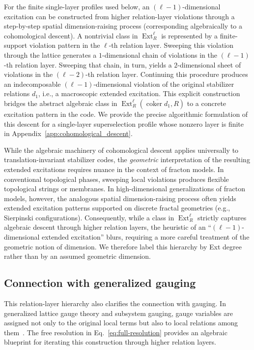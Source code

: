 \documentclass[aps,prx,english,superscriptaddress,twocolumn,tightenlines,showpacs,longbibliography,floatfix,amsfonts]{revtex4-2}
\theoremstyle{remark}
\theoremstyle{definition}
\begin{document}
For the finite single-layer profiles used below, an $(\ell-1)$-dimensional
excitation can be constructed from higher relation-layer violations through a
step-by-step spatial
dimension-raising process (corresponding algebraically to a cohomological
descent). A nontrivial class in $\operatorname{Ext}_R^\ell$ is represented by
a finite-support violation pattern in the $\ell$-th relation layer. Sweeping
this violation through the lattice generates a $1$-dimensional chain of
violations in the $(\ell-1)$-th relation layer. Sweeping that chain, in turn,
yields a $2$-dimensional sheet of violations in the $(\ell-2)$-th relation
layer. Continuing this procedure produces an indecomposable
$(\ell-1)$-dimensional violation of the original stabilizer relations $d_1$,
i.e., a macroscopic extended excitation. This explicit construction bridges
the abstract algebraic class in
$\operatorname{Ext}_R^\ell(\overline{\operatorname{coker}d_1},R)$ to a
concrete excitation pattern in the code. We provide the precise algorithmic
formulation of this descent for a single-layer superselection profile whose
nonzero layer is finite in Appendix~\ref{app:cohomological_descent}.

While the algebraic machinery of cohomological descent applies universally to translation-invariant stabilizer codes, the \textit{geometric} interpretation of the resulting extended excitations requires nuance in the context of fracton models. In conventional topological phases, sweeping local violations produces flexible topological strings or membranes. In high-dimensional generalizations of fracton models, however, the analogous spatial dimension-raising process often yields extended excitation patterns supported on discrete fractal geometries (e.g., Sierpinski configurations). Consequently, while a class in $\operatorname{Ext}_R^\ell$ strictly captures algebraic descent through higher relation layers, the heuristic of an ``$(\ell-1)$-dimensional extended excitation'' blurs, requiring a more careful treatment of the geometric notion of dimension. We therefore label this hierarchy by Ext degree rather than by an assumed geometric dimension.

\subsection{Connection with generalized gauging}
\label{subsec:gauging-connection}

This relation-layer hierarchy also clarifies the connection with gauging. In
generalized lattice gauge theory and subsystem gauging, gauge variables are
assigned not only to the original local terms but also to local relations
among them~\cite{Williamson2016Ungauging,Vijay2016,
ShirleySlagleChen2019Gauging}. The free resolution in
Eq.~\eqref{eq:full-resolution} provides an algebraic blueprint for iterating
this construction through higher relation layers.
\end{document}

